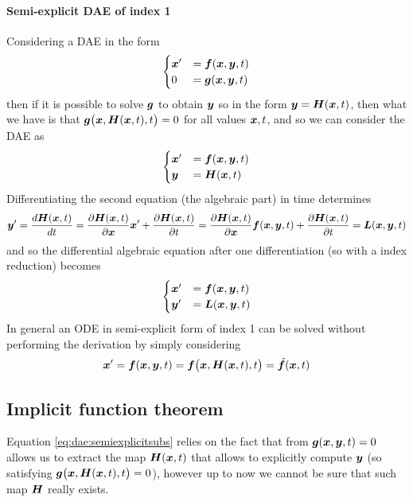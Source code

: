 	\paragraph{Semi-explicit DAE of index 1} Considering a DAE in the form
	\[ \begin{cases}
		\boldsymbol{x}' & = \boldsymbol{f}(\boldsymbol{x}, \boldsymbol{y}, t) \\ 0 & = \boldsymbol{g}(\boldsymbol{x}, \boldsymbol{y}, t)
	\end{cases} \]
	then if it is possible to solve $\boldsymbol{g}$ to obtain $\boldsymbol{y}$ so in the form $\boldsymbol{y} = \boldsymbol{H}(\boldsymbol{x}, t)$, then what we have is that $\boldsymbol{g}\big(\boldsymbol{x}, \boldsymbol{H}(\boldsymbol{x}, t), t\big) = 0$ for all values $\boldsymbol{x}, t$, and so we can consider the DAE as
	\[ \begin{cases}
		\boldsymbol{x}' & = \boldsymbol{f}(\boldsymbol{x}, \boldsymbol{y}, t) \\ \boldsymbol{y} & = \boldsymbol{H}(\boldsymbol{x}, t)
	\end{cases} \] 
	Differentiating the second equation (the algebraic part) in time determines
	\[ \boldsymbol{y} ' = \frac{d\boldsymbol{H} (\boldsymbol{x}, t)}{dt} = \frac{\partial \boldsymbol{H}(\boldsymbol{x}, t)}{\partial \boldsymbol{x}} \boldsymbol{x}' + \frac{\partial \boldsymbol{H}(\boldsymbol{x},t)}{\partial t} = \frac{\partial \boldsymbol{H}(\boldsymbol{x}, t)}{\partial \boldsymbol{x}} \boldsymbol{f}(\boldsymbol{x}, \boldsymbol{y}, t) + \frac{\partial \boldsymbol{H}(\boldsymbol{x},t)}{\partial t} = \boldsymbol{L}(\boldsymbol{x}, \boldsymbol{y}, t)  \]
	and so the differential algebraic equation after one differentiation (so with a index reduction) becomes
	\[ \begin{cases}
		\boldsymbol{x}' & = \boldsymbol{f}(\boldsymbol{x}, \boldsymbol{y}, t) \\ \boldsymbol{y}' & = \boldsymbol{L}(\boldsymbol{x}, \boldsymbol{y}, t)
	\end{cases} \] 
	In general an ODE in semi-explicit form of index 1 can be solved without performing the derivation by simply considering
	\begin{equation} \label{eq:dae:semiexplicitsubs}
		\boldsymbol{x}' = \boldsymbol{f}(\boldsymbol{x}, \boldsymbol{y}, t) = \boldsymbol{f}\big(\boldsymbol{x}, \boldsymbol{H}(\boldsymbol{x}, t), t\big) = \tilde{\boldsymbol{f}}(\boldsymbol{x}, t)
	\end{equation}
\subsection{Implicit function theorem}
	Equation \ref{eq:dae:semiexplicitsubs} relies on the fact that from $\boldsymbol{g} ( \boldsymbol{x}, \boldsymbol{y}, t) = 0$ allows us to extract the map $\boldsymbol{H}(\boldsymbol{x},t)$ that allows to explicitly compute $\boldsymbol{y}$ (so satisfying $\boldsymbol{g}\big(\boldsymbol{x}, \boldsymbol{H}(\boldsymbol{x}, t), t\big) = 0$), however up to now we cannot be sure that such map $\boldsymbol{H}$ really exists.
	
